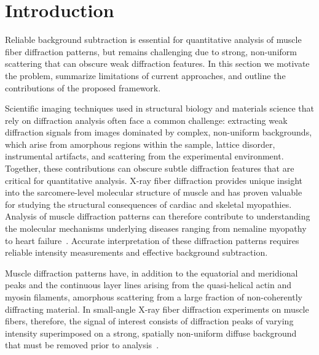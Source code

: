\documentclass[iucr]{iucrjournals}
\begin{document}




\section{Introduction}

Reliable background subtraction is essential for quantitative analysis of muscle fiber diffraction patterns, but remains challenging due to strong, non-uniform scattering that can obscure weak diffraction features. In this section we motivate the problem, summarize limitations of current approaches, and outline the contributions of the proposed framework.


Scientific imaging techniques used in structural biology and materials science that rely on diffraction analysis often face a common challenge: extracting weak diffraction signals from images dominated by complex, non-uniform backgrounds, which arise from amorphous regions within the sample, lattice disorder, instrumental artifacts, and scattering from the experimental environment. Together, these contributions can obscure subtle diffraction features that are critical for quantitative analysis. X-ray fiber diffraction provides unique insight into the sarcomere-level molecular structure of muscle and has proven valuable for studying the structural consequences of cardiac and skeletal myopathies. Analysis of muscle diffraction patterns can therefore contribute to understanding the molecular mechanisms underlying diseases ranging from nemaline myopathy to heart failure~\cite{MaIrving2022}. Accurate interpretation of these diffraction patterns requires reliable intensity measurements and effective background subtraction.

Muscle diffraction patterns have, in addition to the equatorial and meridional peaks and the continuous layer lines arising from the quasi-helical actin and myosin filaments, amorphous scattering from a large fraction of non-coherently diffracting material. In small-angle X-ray fiber diffraction experiments on muscle fibers, therefore, the signal of interest consists of diffraction peaks of varying intensity superimposed on a strong, spatially non-uniform diffuse background that must be removed prior to analysis~\cite{squire2003ccp13_software}.
\end{document}
